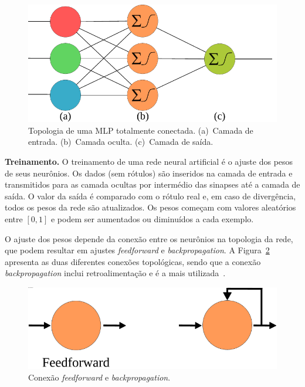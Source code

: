 \begin{figure}[!htb]
    \centering
    \includegraphics[scale=0.65]{_fig/ANN.pdf}
    \caption[Topologia de uma MLP totalmente conectada]{Topologia de uma MLP totalmente conectada.
    (a)~Camada de entrada.
    (b)~Camada oculta.
    (c)~Camada de saída. }
    \label{fig:ann}
\end{figure}

\noindent
\textbf{Treinamento.}
O treinamento de uma rede neural artificial é o ajuste dos pesos de seus neurônios.
Os dados (sem rótulos) são inseridos na camada de entrada e transmitidos para as camada ocultas por intermédio das sinapses até a camada de saída.  
O valor da saída é comparado com o rótulo real e, em caso de divergência, todos os pesos da rede são atualizados.
Os pesos começam com valores aleatórios entre $[0,1]$ e podem ser aumentados ou diminuídos a cada exemplo.

O ajuste dos pesos depende da conexão entre os neurônios na topologia da rede, que podem resultar em ajustes \textit{feedforward} e \textit{backpropagation}.
A Figura~\ref{fig:feedvsback} apresenta as duas diferentes conexões topológicas, sendo que a conexão \textit{backpropagation} inclui retroalimentação e é a mais utilizada~\cite{Faceli2008}.

\begin{figure}[!htb]
    \centering
    \includegraphics[scale=.6]{_fig/feedvsback.pdf}
    \caption[Conexão \textit{feedforward} e \textit{backpropagation}]{Conexão \textit{feedforward} e \textit{backpropagation}.}
    \label{fig:feedvsback}
\end{figure}

